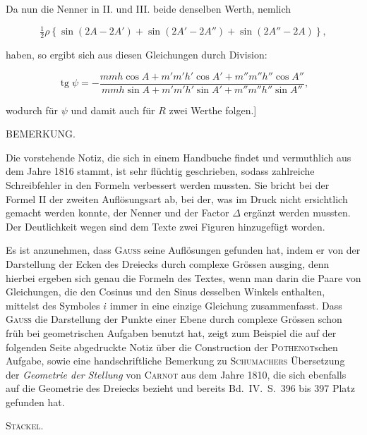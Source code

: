 Da nun die Nenner in II. und III. beide denselben Werth, nemlich

\[
\tfrac{1}{2}\rho\left\{\sin(2A-2A')+\sin(2A'-2A'')+\sin(2A''-2A)\right\},
\]

haben, so ergibt sich aus diesen Gleichungen durch Division:

\[
\operatorname{tg}\psi = -\dfrac{mmh\cos A+m'm'h'\cos A'+m''m''h''\cos A''}{mmh\sin A+m'm'h'\sin A'+m''m''h''\sin A''},
\]

wodurch für $\psi$ und damit auch für $R$ zwei Werthe folgen.]

\bigskip
\begin{center}
\hrulefill
\end{center}
\bigskip

\begin{center}
BEMERKUNG.
\end{center}

Die vorstehende Notiz, die sich in einem Handbuche findet und vermuthlich aus dem Jahre 1816 stammt, ist sehr flüchtig geschrieben, sodass zahlreiche Schreibfehler in den Formeln verbessert werden mussten. Sie bricht bei der Formel II der zweiten Auflösungsart ab, bei der, was im Druck nicht ersichtlich gemacht werden konnte, der Nenner und der Factor $\Delta$ ergänzt werden mussten. Der Deutlichkeit wegen sind dem Texte zwei Figuren hinzugefügt worden.

Es ist anzunehmen, dass \textsc{Gauss} seine Auflösungen gefunden hat, indem er von der Darstellung der Ecken des Dreiecks durch complexe Grössen ausging, denn hierbei ergeben sich genau die Formeln des Textes, wenn man darin die Paare von Gleichungen, die den Cosinus und den Sinus desselben Winkels enthalten, mittelst des Symboles $i$ immer in eine einzige Gleichung zusammenfasst. Dass \textsc{Gauss} die Darstellung der Punkte einer Ebene durch complexe Grössen schon früh bei geometrischen Aufgaben benutzt hat, zeigt zum Beispiel die auf der folgenden Seite abgedruckte Notiz über die Construction der \textsc{Pothenot}schen Aufgabe, sowie eine handschriftliche Bemerkung zu \textsc{Schumachers} Übersetzung der \emph{Geometrie der Stellung} von \textsc{Carnot} aus dem Jahre 1810, die sich ebenfalls auf die Geometrie des Dreiecks bezieht und bereits Bd.\ IV.\ S.\ 396 bis 397 Platz gefunden hat.

\hfill \textsc{Stäckel}.

\bigskip
\begin{center}
\hrulefill
\end{center}
